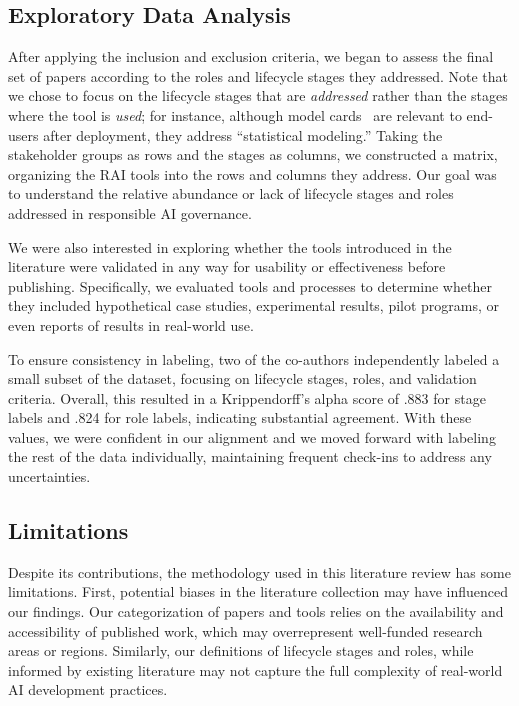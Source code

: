 \subsection{Exploratory Data Analysis}
After applying the inclusion and exclusion criteria, we began to assess the final set of papers according to the roles and lifecycle stages they addressed. 
Note that we chose to focus on the lifecycle stages that are \emph{addressed} rather than the stages where the tool is \emph{used}; for instance, although model cards~\cite{Mitchell2019} are relevant to end-users after deployment, they address ``statistical modeling.''
Taking the stakeholder groups as rows and the stages as columns, we constructed a matrix, organizing the RAI tools into the rows and columns they address.
Our goal was to understand the relative abundance or lack of lifecycle stages and roles addressed in responsible AI governance. 

We were also interested in exploring whether the tools introduced in the literature were validated in any way for usability or effectiveness before publishing. Specifically, we evaluated tools and processes to determine whether they included hypothetical case studies,
experimental results, pilot programs, or even reports of results in real-world use.

To ensure consistency in labeling, two of the co-authors independently labeled a small subset of the dataset, focusing on lifecycle stages, roles, and validation criteria. Overall, this resulted in a Krippendorff's alpha score of .883 for stage labels and .824 for role labels, indicating substantial agreement. With these values, we were confident in our alignment and we moved forward with labeling the rest of the data individually, maintaining frequent check-ins to address any uncertainties.

\subsection{Limitations}
Despite its contributions, the methodology used in this literature review has some limitations. First, potential biases in the literature collection may have influenced our findings. Our categorization of papers and tools relies on the availability and accessibility of published work, which may overrepresent well-funded research areas or regions. Similarly, our definitions of lifecycle stages and roles, while informed by existing literature
may not capture the full complexity of real-world AI development practices.

